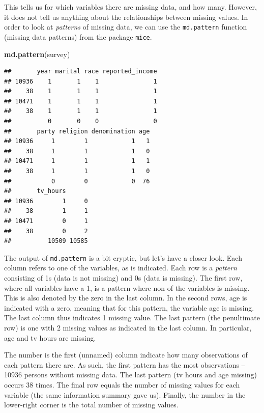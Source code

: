 \documentclass[]{tufte-book}
\newenvironment{Shaded}{}{}
\newcommand{\KeywordTok}[1]{\textcolor[rgb]{0.00,0.44,0.13}{\textbf{#1}}}
\newcommand{\NormalTok}[1]{#1}
\begin{document}
This tells us for which variables there are missing data, and how many.
However, it does not tell us anything about the relationships between
missing values. In order to look at \emph{patterns} of missing data, we
can use the \texttt{md.pattern} function (missing data patterns) from
the package \texttt{mice}.

\begin{Shaded}
\begin{Highlighting}[]
\KeywordTok{md.pattern}\NormalTok{(survey)}
\end{Highlighting}
\end{Shaded}

\begin{verbatim}
##       year marital race reported_income
## 10936    1       1    1               1
##    38    1       1    1               1
## 10471    1       1    1               1
##    38    1       1    1               1
##          0       0    0               0
##       party religion denomination age
## 10936     1        1            1   1
##    38     1        1            1   0
## 10471     1        1            1   1
##    38     1        1            1   0
##           0        0            0  76
##       tv_hours      
## 10936        1     0
##    38        1     1
## 10471        0     1
##    38        0     2
##          10509 10585
\end{verbatim}

The output of \texttt{md.pattern} is a bit cryptic, but let's have a
closer look. Each column refers to one of the variables, as is
indicated. Each row is a \emph{pattern} consisting of 1s (data is not
missing) and 0s (data is missing). The first row, where all variables
have a 1, is a pattern where non of the variables is missing. This is
also denoted by the zero in the last column. In the second rows, age is
indicated with a zero, meaning that for this pattern, the variable age
is missing. The last column thus indicates 1 missing value. The last
pattern (the penultimate row) is one with 2 missing values as indicated
in the last column. In particular, age and tv hours are missing.

The number is the first (unnamed) column indicate how many observations
of each pattern there are. As such, the first pattern has the most
observations -- 10936 persons without missing data. The last pattern (tv
hours and age missing) occurs 38 times. The final row equals the number
of missing values for each variable (the same information summary gave
us). Finally, the number in the lower-right corner is the total number
of missing values.
\end{document}
